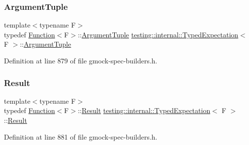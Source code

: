\mbox{\label{classtesting_1_1internal_1_1TypedExpectation_a9a91379262d101f435809ba4556d14fa}} 
\subsubsection{\texorpdfstring{Argument\+Tuple}{ArgumentTuple}}
{\footnotesize\ttfamily template$<$typename F$>$ \\
typedef \hyperlink{structtesting_1_1internal_1_1Function}{Function}$<$F$>$\+::\hyperlink{classtesting_1_1internal_1_1TypedExpectation_a9a91379262d101f435809ba4556d14fa}{Argument\+Tuple} \hyperlink{classtesting_1_1internal_1_1TypedExpectation}{testing\+::internal\+::\+Typed\+Expectation}$<$ F $>$\+::\hyperlink{classtesting_1_1internal_1_1TypedExpectation_a9a91379262d101f435809ba4556d14fa}{Argument\+Tuple}}



Definition at line 879 of file gmock-\/spec-\/builders.\+h.

\mbox{\label{classtesting_1_1internal_1_1TypedExpectation_a6503597ee9d5ec940bfe8e51832b2422}} 
\subsubsection{\texorpdfstring{Result}{Result}}
{\footnotesize\ttfamily template$<$typename F$>$ \\
typedef \hyperlink{structtesting_1_1internal_1_1Function}{Function}$<$F$>$\+::\hyperlink{classtesting_1_1internal_1_1TypedExpectation_a6503597ee9d5ec940bfe8e51832b2422}{Result} \hyperlink{classtesting_1_1internal_1_1TypedExpectation}{testing\+::internal\+::\+Typed\+Expectation}$<$ F $>$\+::\hyperlink{classtesting_1_1internal_1_1TypedExpectation_a6503597ee9d5ec940bfe8e51832b2422}{Result}}



Definition at line 881 of file gmock-\/spec-\/builders.\+h.




